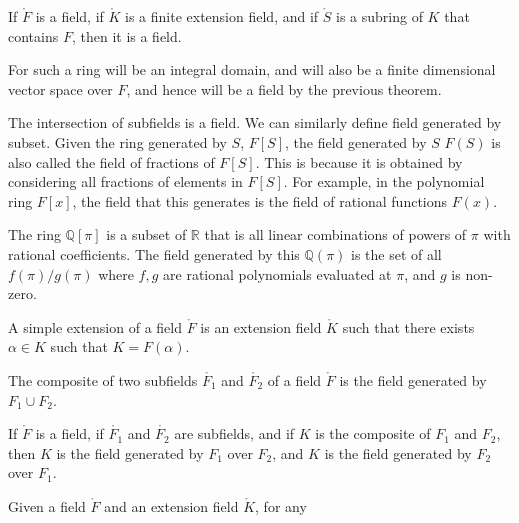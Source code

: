 \documentclass{article}                                                        %
\begin{document}
        \begin{theorem}
            If $\ring{F}$ is a field, if $\ring{K}$ is a finite extension field,
            and if $\ring{S}$ is a subring of $K$ that contains $F$, then it is
            a field.
        \end{theorem}
        \begin{theorem}
            For such a ring will be an integral domain, and will also be a
            finite dimensional vector space over $F$, and hence will be a field
            by the previous theorem.
        \end{theorem}
        The intersection of subfields is a field. We can similarly define field
        generated by subset. Given the ring generated by $S$, $F[S]$, the field
        generated by $S$ $F(S)$ is also called the field of fractions of $F[S]$.
        This is because it is obtained by considering all fractions of elements
        in $F[S]$. For example, in the polynomial ring $F[x]$, the field that
        this generates is the field of rational functions $F(x)$.
        \begin{example}
            The ring $\mathbb{Q}[\pi]$ is a subset of $\mathbb{R}$ that is all
            linear combinations of powers of $\pi$ with rational coefficients.
            The field generated by this $\mathbb{Q}(\pi)$ is the set of all
            $f(\pi)/g(\pi)$ where $f,g$ are rational polynomials evaluated at
            $\pi$, and $g$ is non-zero.
        \end{example}
        \begin{definition}
            A simple extension of a field $\ring{F}$ is an extension field
            $\ring{K}$ such that there exists $\alpha\in{K}$ such that
            $K=F(\alpha)$.
        \end{definition}
        \begin{definition}
            The composite of two subfields $\ring{F_{1}}$ and $\ring{F_{2}}$
            of a field $\ring{F}$ is the field generated by $F_{1}\cup{F}_{2}$.
        \end{definition}
        \begin{theorem}
            If $\ring{F}$ is a field, if $\ring{F_{1}}$ and $\ring{F_{2}}$ are
            subfields, and if $K$ is the composite of $F_{1}$ and $F_{2}$,
            then $K$ is the field generated by $F_{1}$ over $F_{2}$, and $K$ is
            the field generated by $F_{2}$ over $F_{1}$.
        \end{theorem}
        Given a field $\ring{F}$ and an extension field $\ring{K}$, for any
\end{document}
